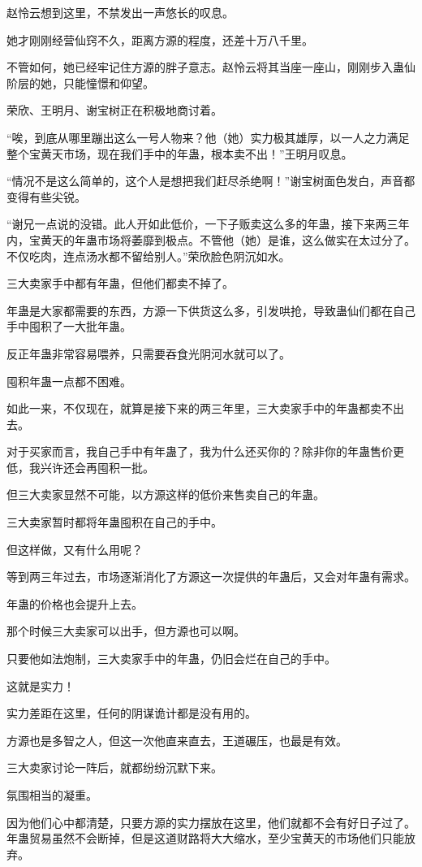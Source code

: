 \begin{this_body}
赵怜云想到这里，不禁发出一声悠长的叹息。

她才刚刚经营仙窍不久，距离方源的程度，还差十万八千里。

不管如何，她已经牢记住方源的胖子意志。赵怜云将其当座一座山，刚刚步入蛊仙阶层的她，只能憧憬和仰望。

荣欣、王明月、谢宝树正在积极地商讨着。

“唉，到底从哪里蹦出这么一号人物来？他（她）实力极其雄厚，以一人之力满足整个宝黄天市场，现在我们手中的年蛊，根本卖不出！”王明月叹息。

“情况不是这么简单的，这个人是想把我们赶尽杀绝啊！”谢宝树面色发白，声音都变得有些尖锐。

“谢兄一点说的没错。此人开如此低价，一下子贩卖这么多的年蛊，接下来两三年内，宝黄天的年蛊市场将萎靡到极点。不管他（她）是谁，这么做实在太过分了。不仅吃肉，连点汤水都不留给别人。”荣欣脸色阴沉如水。

三大卖家手中都有年蛊，但他们都卖不掉了。

年蛊是大家都需要的东西，方源一下供货这么多，引发哄抢，导致蛊仙们都在自己手中囤积了一大批年蛊。

反正年蛊非常容易喂养，只需要吞食光阴河水就可以了。

囤积年蛊一点都不困难。

如此一来，不仅现在，就算是接下来的两三年里，三大卖家手中的年蛊都卖不出去。

对于买家而言，我自己手中有年蛊了，我为什么还买你的？除非你的年蛊售价更低，我兴许还会再囤积一批。

但三大卖家显然不可能，以方源这样的低价来售卖自己的年蛊。

三大卖家暂时都将年蛊囤积在自己的手中。

但这样做，又有什么用呢？

等到两三年过去，市场逐渐消化了方源这一次提供的年蛊后，又会对年蛊有需求。

年蛊的价格也会提升上去。

那个时候三大卖家可以出手，但方源也可以啊。

只要他如法炮制，三大卖家手中的年蛊，仍旧会烂在自己的手中。

这就是实力！

实力差距在这里，任何的阴谋诡计都是没有用的。

方源也是多智之人，但这一次他直来直去，王道碾压，也最是有效。

三大卖家讨论一阵后，就都纷纷沉默下来。

氛围相当的凝重。

因为他们心中都清楚，只要方源的实力摆放在这里，他们就都不会有好日子过了。年蛊贸易虽然不会断掉，但是这道财路将大大缩水，至少宝黄天的市场他们只能放弃。


\end{this_body}
